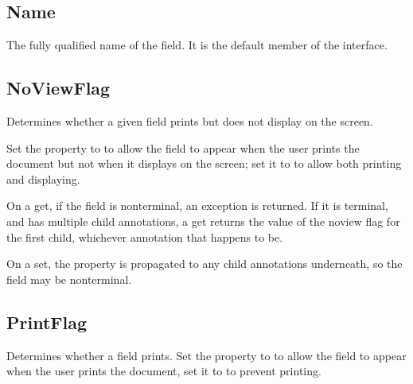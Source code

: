 \documentclass[letterpaper,12pt,english,openany,oneside]{sphinxmanual}
\begin{document}
\subsection{Name}
\label{\detokenize{IAC_API_FormsIntro:name}}
The fully qualified name of the field. It is the default member of the  interface.

\label{\detokenize{IAC_API_FormsIntro:syntax-25}}

\begin{sphinxVerbatim}[commandchars=\\\{\}]
\PYG{p}{[}\PYG{p}{]} 
\end{sphinxVerbatim}




\subsection{NoViewFlag}
\label{\detokenize{IAC_API_FormsIntro:noviewflag}}
Determines whether a given field prints but does not display on the screen.

Set the  property to  to allow the field to appear when the user prints the document but not when it displays on the screen; set it to  to allow both printing and displaying.

On a get, if the field is non\sphinxhyphen{}terminal, an exception  is returned. If it is terminal, and has multiple child annotations, a get returns the value of the no\sphinxhyphen{}view flag for the first child, whichever annotation that happens to be.

On a set, the property is propagated to any child annotations underneath, so the field may be non\sphinxhyphen{}terminal.

\label{\detokenize{IAC_API_FormsIntro:syntax-26}}

\begin{sphinxVerbatim}[commandchars=\\\{\}]
\PYG{p}{[}\PYG{p}{]} 
\end{sphinxVerbatim}




\subsection{PrintFlag}
\label{\detokenize{IAC_API_FormsIntro:printflag}}
Determines whether a field prints. Set the  property to  to allow the field to appear when the user prints the document, set it to  to prevent printing.
\end{document}
